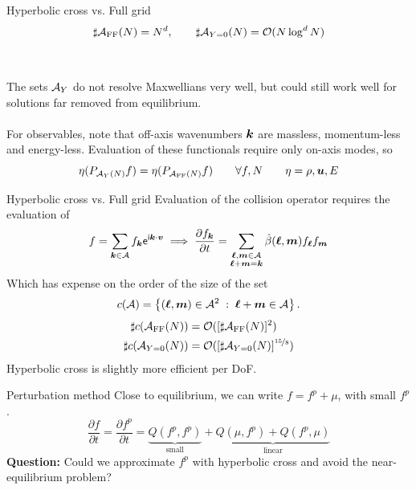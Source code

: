 \documentclass[hyperref={bookmarksopen, colorlinks, linkcolor=blue, urlcolor=green, citecolor=red}, color={usenames,dvipsnames}]{beamer}
\begin{document}
\begin{frame}{Hyperbolic cross vs. Full grid}
\[
    \sharp\mathcal{A}_\text{FF}(N) = N^d, \qquad \sharp\mathcal{A}_{Y=0}(N) = \mathcal{O}(N \log^d N)
\] \\~\\

The sets $\mathcal{A}_Y$ do not resolve Maxwellians very well, but could still work well for solutions far removed
from equilibrium. \\~\\

For observables, note that off-axis wavenumbers ${\bm k}$ are massless, momentum-less and energy-less. Evaluation
of these functionals require only on-axis modes, so
\[
    \eta(P_{\mathcal{A}_Y(N)} f) = \eta(P_{\mathcal{A}_\text{FF}(N)}f) \qquad \forall f, N \qquad \eta = \rho, {\bm u}, E
\]
\end{frame}

\begin{frame}{Hyperbolic cross vs. Full grid}
Evaluation of the collision operator requires the evaluation of
\[
    f = \sum_{{\bm k}\in\mathcal{A}} f_{\bm k} \mathsf{e}^{\mathsf{i}{\bm k}\cdot{\bm v}}
    \implies
    \frac{\partial f_{\bm k}}{\partial t} = \sum_{\substack{{\bm \ell},{\bm m}\in\mathcal{A} \\ {\bm \ell}+{\bm m}={\bm k}}} 
    \hat{\beta}({\bm \ell},{\bm m}) f_{\bm \ell} f_{\bm m}
\]
Which has expense on the order of the size of the set
\[
    c(\mathcal{A}) = \left\{ ({\bm \ell},{\bm m}) \in \mathcal{A}^2 \;:\; {\bm \ell}+{\bm m} \in \mathcal{A} \right\}.
\]
\begin{align*}
    \sharp c(\mathcal{A}_\text{FF}(N)) &= \mathcal{O}([\sharp\mathcal{A}_\text{FF}(N)]^2) \\
    \sharp c(\mathcal{A}_{Y=0}(N)) &= \mathcal{O}([\sharp\mathcal{A}_{Y=0}(N)]^{\nicefrac{15}{8}})
\end{align*}
Hyperbolic cross is slightly more efficient per DoF.
\end{frame}

\begin{frame}{Perturbation method}
Close to equilibrium, we can write $f = f^p + \mu$, with small $f^p$.
\[
    \frac{\partial f}{\partial t} = \frac{\partial f^p}{\partial t} = 
    \underbrace{Q(f^p,f^p)}_{\text{small}} +
    \underbrace{Q(\mu,f^p) + Q(f^p,\mu)}_{\text{linear}}
\]
{\bf Question:} Could we approximate $f^p$ with hyperbolic cross and avoid the near-equilibrium problem? \\~\\

\begin{overlayarea}{\textwidth}{0.3cm}
\end{overlayarea}
\end{frame}
\end{document}
